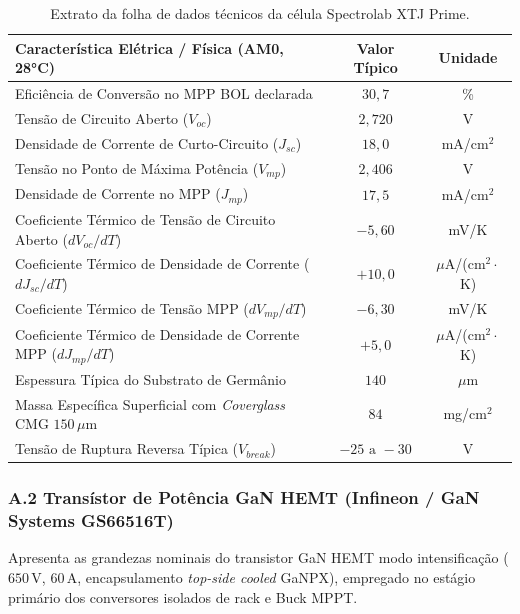 \begin{table}[!ht]
\centering
\small
\renewcommand{\arraystretch}{0.85}
\caption{Extrato da folha de dados técnicos da célula Spectrolab XTJ Prime.}
\label{tab:anexo_xtj_prime}
\begin{tabular}{lcc}
\hline
\textbf{Característica Elétrica / Física (AM0, 28°C)} & \textbf{Valor Típico} & \textbf{Unidade} \\ \hline
Eficiência de Conversão no MPP BOL declarada & $30{,}7$ & \% \\
Tensão de Circuito Aberto ($V_{oc}$) & $2{,}720$ & V \\
Densidade de Corrente de Curto-Circuito ($J_{sc}$) & $18{,}0$ & mA/cm$^2$ \\
Tensão no Ponto de Máxima Potência ($V_{mp}$) & $2{,}406$ & V \\
Densidade de Corrente no MPP ($J_{mp}$) & $17{,}5$ & mA/cm$^2$ \\
Coeficiente Térmico de Tensão de Circuito Aberto ($dV_{oc}/dT$) & $-5{,}60$ & mV/K \\
Coeficiente Térmico de Densidade de Corrente ($dJ_{sc}/dT$) & $+10{,}0$ & $\mu$A/(cm$^2\cdot$K) \\
Coeficiente Térmico de Tensão MPP ($dV_{mp}/dT$) & $-6{,}30$ & mV/K \\
Coeficiente Térmico de Densidade de Corrente MPP ($dJ_{mp}/dT$) & $+5{,}0$ & $\mu$A/(cm$^2\cdot$K) \\
Espessura Típica do Substrato de Germânio & $140$ & $\mu$m \\
Massa Específica Superficial com \textit{Coverglass} CMG $150\,\mu\text{m}$ & $84$ & mg/cm$^2$ \\
Tensão de Ruptura Reversa Típica ($V_{break}$) & $-25\text{ a }-30$ & V \\ \hline
\end{tabular}
\end{table}

\subsubsection*{A.2 Transístor de Potência GaN HEMT (Infineon / GaN Systems GS66516T)}
Apresenta as grandezas nominais do transistor GaN HEMT modo intensificação ($650\,\mathrm{V}$, $60\,\mathrm{A}$, encapsulamento \textit{top-side cooled} GaNPX), empregado no estágio primário dos conversores isolados de rack e Buck MPPT.

